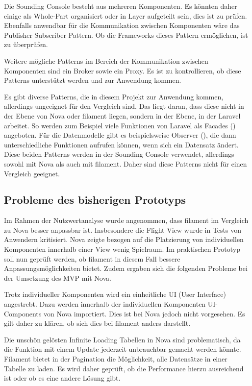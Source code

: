 Die Sounding Console besteht aus mehreren Komponenten.
Es könnten daher einige als Whole-Part organisiert oder in Layer aufgeteilt sein, dies ist zu prüfen.
Ebenfalls anwendbar für die Kommunikation zwischen Komponenten wäre das Publisher-Subscriber Pattern.
Ob die Frameworks dieses Pattern ermöglichen, ist zu überprüfen.

Weitere mögliche Patterns im Bereich der Kommunikation zwischen Komponenten sind ein Broker sowie ein Proxy.
Es ist zu kontrollieren, ob diese Patterns unterstützt werden und zur Anwendung kommen.

Es gibt diverse Patterns, die in diesem Projekt zur Anwendung kommen, allerdings ungeeignet für den Vergleich sind.
Das liegt daran, dass diese nicht in der Ebene von Nova oder filament liegen, sondern in der Ebene, in der Laravel arbeitet.
So werden zum Beispiel viele Funktionen von Laravel als Facades (\cite{gamma-design-patterns}) angeboten.
Für die Datenmodelle gibt es beispielsweise Observer (\cite{gamma-design-patterns}), die dann unterschiedliche Funktionen aufrufen können, wenn sich ein Datensatz ändert.
Diese beiden Patterns werden in der Sounding Console verwendet, allerdings sowohl mit Nova als auch mit filament.
Daher sind diese Patterns nicht für einen Vergleich geeignet.

\newpage

\subsection{Probleme des bisherigen Prototyps}
Im Rahmen der Nutzwertanalyse wurde angenommen, dass filament im Vergleich zu Nova besser anpassbar ist.
Insbesondere die Flight View wurde in Tests von Anwendern kritisiert.
Nova zeigte bezogen auf die Platzierung von individuellen Komponenten innerhalb einer View wenig Spielraum.
Im praktischen Prototyp soll nun geprüft werden, ob filament in diesem Fall bessere Anpassungsmöglichkeiten bietet.
Zudem ergaben sich die folgenden Probleme bei der Umsetzung des MVP mit Nova.

Trotz individueller Komponenten wird ein einheitliche UI (User Interface) angestrebt.
Dazu werden innerhalb der individuellen Komponenten UI-Components von Nova importiert.
Dies ist bei Nova jedoch nicht vorgesehen.
Es gilt daher zu klären, ob sich dies bei filament anders darstellt.

Die unschön gelösten Infinite Loading Tabellen in Nova sind problematisch, da die Funktion mit einem Update jederzeit unbrauchbar gemacht werden könnte.
Filament bietet in der Pagination die Möglichkeit, alle Datensätze in einer Tabelle zu laden.
Es wird daher geprüft, ob die Performance hierzu ausreichend ist oder ob es eine andere Lösung gibt.

